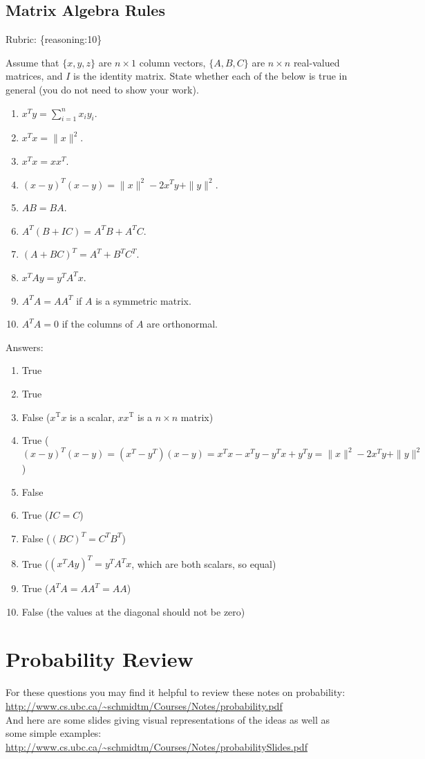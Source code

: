 \documentclass{article}
\def\rubric#1{\gre{Rubric: \{#1\}}}{}
\def\blu#1{{\color{blu}#1}}
\def\gre#1{{\color{gre}#1}}
\def\red#1{{\color{red}#1}}
\def\norm#1{\|#1\|}
\begin{document}
\subsection{Matrix Algebra Rules}
\rubric{reasoning:10}

Assume that $\{x,y,z\}$ are $n \times 1$ column vectors, $\{A,B,C\}$ are $n \times n$ real-valued matrices, and $I$ is the identity matrix. \blu{State whether each of the below is true in general} (you do not need to show your work).

\begin{enumerate}
\item $x^Ty = \sum_{i=1}^n x_iy_i$.
\item $x^Tx = \norm{x}^2$.
\item $x^Tx = xx^T$.
\item $(x-y)^T(x-y) = \norm{x}^2 - 2x^Ty + \norm{y}^2$.
\item $AB=BA$.
\item $A^T(B + IC) = A^TB + A^TC$.
\item $(A + BC)^T = A^T + B^TC^T$.
\item $x^TAy = y^TA^Tx$.
\item $A^TA = AA^T$ if $A$ is a symmetric matrix.
\item $A^TA = 0$ if the columns of $A$ are orthonormal.
\end{enumerate}
\red{Answers:
\begin{enumerate}
\item True
\item True
\item False ($x^{\text{T}}x$ is a scalar, $xx^{\text{T}}$ is a $n\times n$ matrix)
\item True ($(x-y)^T(x-y) = (x^{T}-y^{T})(x-y)=x^Tx-x^Ty-y^Tx+y^Ty= \norm{x}^2 - 2x^Ty + \norm{y}^2$)
\item False
\item True ($IC=C$)
\item False ($(BC)^T=C^TB^T$)
\item True ($(x^TAy)^T=y^TA^Tx$, which are both scalars, so equal)
\item True  ($A^TA=AA^T=AA$)
\item False (the values at the diagonal should not be zero)
\end{enumerate}}
\section{Probability Review}


For these questions you may find it helpful to review these notes on probability:\\
\url{http://www.cs.ubc.ca/~schmidtm/Courses/Notes/probability.pdf}\\
And here are some slides giving visual representations of the ideas as well as some simple examples:\\
\url{http://www.cs.ubc.ca/~schmidtm/Courses/Notes/probabilitySlides.pdf}
\end{document}
